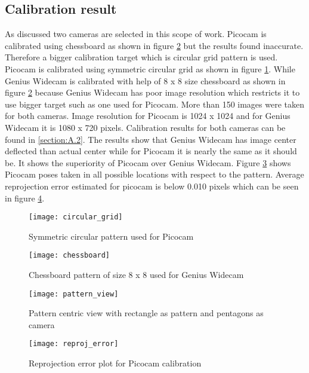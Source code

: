 \subsection{Calibration result}
As discussed two cameras are selected in this scope of work. Picocam is calibrated using chessboard as shown in figure \ref{fig:chessboard} but the results found inaccurate. Therefore a bigger calibration target which is circular grid pattern is used. Picocam is calibrated using symmetric circular grid as shown in figure \ref{fig:circular_grid}. While Genius Widecam is calibrated with help of 8 x 8 size chessboard as shown in figure \ref{fig:chessboard} because Genius Widecam has poor image resolution which restricts it to use bigger target such as one used for Picocam. More than 150 images were taken for both cameras. Image resolution for Picocam is 1024 x 1024 and for Genius Widecam it is 1080 x 720 pixels. Calibration results for both cameras can be found in \ref{section:A.2}. The results show that Genius Widecam has image center deflected than actual center while for Picocam it is nearly the same as it should be. It shows the superiority of Picocam over Genius Widecam. Figure \ref{fig:pattern_view} shows Picocam poses taken in all possible locations with respect to the pattern. Average reprojection error estimated for picocam is below 0.010 pixels which can be seen in figure \ref{fig:reproj}.\\
\begin{figure}[H]
	\centering
	\texttt{[image: circular\_grid]}
	\caption{Symmetric circular pattern used for Picocam}
	\label{fig:circular_grid}
\end{figure}%
\begin{figure}[H]
	\centering
	\texttt{[image: chessboard]}
	\caption{Chessboard pattern of size 8 x 8 used for Genius Widecam}
	\label{fig:chessboard}
\end{figure}
\begin{figure}[h!]
	\centering
	\texttt{[image: pattern\_view]}
	\caption{Pattern centric view with rectangle as pattern and pentagons as camera}
	\label{fig:pattern_view}
\end{figure}
\begin{figure}[h!]
	\centering
	\texttt{[image: reproj\_error]}
	\caption{Reprojection error plot for Picocam calibration}
	\label{fig:reproj}
\end{figure}